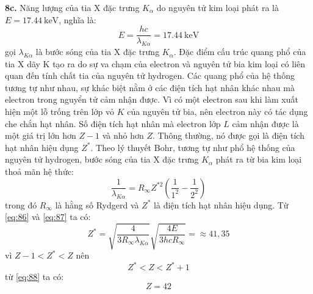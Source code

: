 \noindent\textbf{8c.} Năng lượng của tia X đặc trưng $K_{\alpha}$ do nguyên tử kim loại phát ra là $E=\SI{17,44}{\kilo\electronvolt}$, nghĩa là:
\begin{equation}
  \label{eq:86}
  E=\frac{hc}{\lambda_{K\alpha}}=\SI{17,44}{\kilo\electronvolt}
\end{equation}
gọi $\lambda_{K\alpha}$ là bước sóng của tia X đặc trưng $K_{\alpha}$. Đặc điểm cấu trúc quang phổ của tia X dãy K tạo ra do sự va chạm của electron và nguyên tử bia kim loại có liên quan đến tính chất tia của nguyên tử hydrogen. Các quang phổ của hệ thống tương tự như nhau, sự khác biệt nằm ở các điện tích hạt nhân khác nhau mà electron trong nguyển tử cảm nhận được. Vì có một electron sau khi làm xuất hiện một lỗ trống trên lớp vỏ $K$ của nguyên tử bia, nên electron này có tác dụng che chắn hạt nhân. Số điện tích hạt nhân mà electron lớp $L$ cảm nhận được là một giá trị lớn hơn $Z-1$ và nhỏ hơn $Z$. Thông thường, nó được gọi là điện tích hạt nhân hiệu dụng $Z^{*}$. Theo lý thuyết Bohr, tương tự như phổ hệ thống của nguyên tử hydrogen, bước sóng của tia X đặc trưng $K_{\alpha}$ phát ra từ bia kim loại thoả mãn hệ thức:
\begin{equation}
  \label{eq:87}
  \frac{1}{\lambda_{K\alpha}}=R_{\infty}Z^{*2}\left(\frac{1}{1^{2}}-\frac{1}{2^2}\right)
\end{equation}
trong đó $R_{\infty}$ là hằng số Rydgerd và $Z^{*}$ là điện tích hạt nhân hiệu dụng. Từ \eqref{eq:86} và \eqref{eq:87} ta có:
\begin{equation}
  \label{eq:88}
  Z^{*}=\sqrt{\frac{4}{3R_{\infty}\lambda_{K\alpha}}}\sqrt{\frac{4E}{3hcR_{\infty}}}=\approx 41,35
\end{equation}
vì $Z-1<Z^{*}<Z$ nên
\begin{equation*}
  Z^{*}<Z<Z^{*}+1
\end{equation*}
từ \eqref{eq:88} ta có:
\begin{equation}
  \label{eq:89}
  Z=42
\end{equation}

